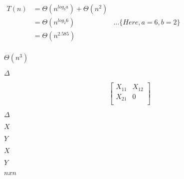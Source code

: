 \documentclass[10pt]{book}
\begin{document}
\begin{mdSnippets}
\begin{mdInlineSnippet}[6279754c48b691470be77e84efcb37ef]%
$\begin{aligned}T(n) &= \Theta(n^{log_{b} a }) + \Theta(n^{2})\\   &= \Theta(n^{log_{2} 6}) & \dots \{Here, a=6, b=2\}\\ &= \Theta(n^{2.585})\\\end{aligned} $\end{mdInlineSnippet}%
\begin{mdInlineSnippet}[e8b8e970f95ac1fee81e92d688736ee3]%
$\Theta(n^{3})$\end{mdInlineSnippet}%
\begin{mdInlineSnippet}[967878d1da852d4b07a961e3168b0fff]%
$\Delta$\end{mdInlineSnippet}%
\begin{mdDisplaySnippet}[806ce3e25056a69ce4a2bd905222f9de]%
\[  \begin{bmatrix}
  X_{11} & X_{12}\\
  X_{21} & 0\\
  \end{bmatrix}
\]%
\end{mdDisplaySnippet}%
\begin{mdInlineSnippet}[967878d1da852d4b07a961e3168b0fff]%
$\Delta$\end{mdInlineSnippet}%
\begin{mdInlineSnippet}[02129bb861061d1a052c592e2dc6b383]%
$X$\end{mdInlineSnippet}%
\begin{mdInlineSnippet}[57cec4137b614c87cb4e24a3d003a3e0]%
$Y$\end{mdInlineSnippet}%
\begin{mdInlineSnippet}[02129bb861061d1a052c592e2dc6b383]%
$X$\end{mdInlineSnippet}%
\begin{mdInlineSnippet}[57cec4137b614c87cb4e24a3d003a3e0]%
$Y$\end{mdInlineSnippet}%
\begin{mdInlineSnippet}%
$n x n$\end{mdInlineSnippet}%
\begin{mdInlineSnippet}%

\end{mdInlineSnippet}
\end{mdSnippets}
\end{document}
